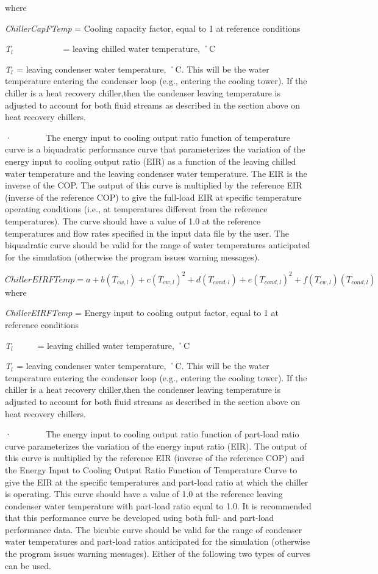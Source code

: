 where

\emph{ChillerCapFTemp} = Cooling capacity factor, equal to 1 at reference conditions

\emph{T\(_{l}\)}~~~~~~~~~~~ = leaving chilled water temperature, ˚C

\emph{T\(_{l}\)}\(_{ }\) = leaving condenser water temperature, ˚C. This will be the water temperature entering the condenser loop (e.g., entering the cooling tower). If the chiller is a heat recovery chiller,then the condenser leaving temperature is adjusted to account for both fluid streams as described in the section above on heat recovery chillers.

·~~~~~~~~The energy input to cooling output ratio function of temperature curve is a biquadratic performance curve that parameterizes the variation of the energy input to cooling output ratio (EIR) as a function of the leaving chilled water temperature and the leaving condenser water temperature. The EIR is the inverse of the COP. The output of this curve is multiplied by the reference EIR (inverse of the reference COP) to give the full-load EIR at specific temperature operating conditions (i.e., at temperatures different from the reference temperatures). The curve should have a value of 1.0 at the reference temperatures and flow rates specified in the input data file by the user. The biquadratic curve should be valid for the range of water temperatures anticipated for the simulation (otherwise the program issues warning messages).

\(ChillerEIRFTemp = a + b({T_{cw,l}}) + c{({T_{cw,l}})^2} + d({T_{cond,l}}) + e{({T_{cond,l}})^2} + f({T_{cw,l}})({T_{cond,l}})\) where

\emph{ChillerEIRFTemp} = Energy input to cooling output factor, equal to 1 at reference conditions

\emph{T\(_{l}\)}~~~~~ = leaving chilled water temperature, ˚C

\emph{T\(_{l}\)}\(_{ }\) = leaving condenser water temperature, ˚C. This will be the water temperature entering the condenser loop (e.g., entering the cooling tower). If the chiller is a heat recovery chiller,then the condenser leaving temperature is adjusted to account for both fluid streams as described in the section above on heat recovery chillers.

·~~~~~~~~The energy input to cooling output ratio function of part-load ratio curve parameterizes the variation of the energy input ratio (EIR). The output of this curve is multiplied by the reference EIR (inverse of the reference COP) and the Energy Input to Cooling Output Ratio Function of Temperature Curve to give the EIR at the specific temperatures and part-load ratio at which the chiller is operating. This curve should have a value of 1.0 at the reference leaving condenser water temperature with part-load ratio equal to 1.0. It is recommended that this performance curve be developed using both full- and part-load performance data. The bicubic curve should be valid for the range of condenser water temperatures and part-load ratios anticipated for the simulation (otherwise the program issues warning messages). Either of the following two types of curves can be used.

